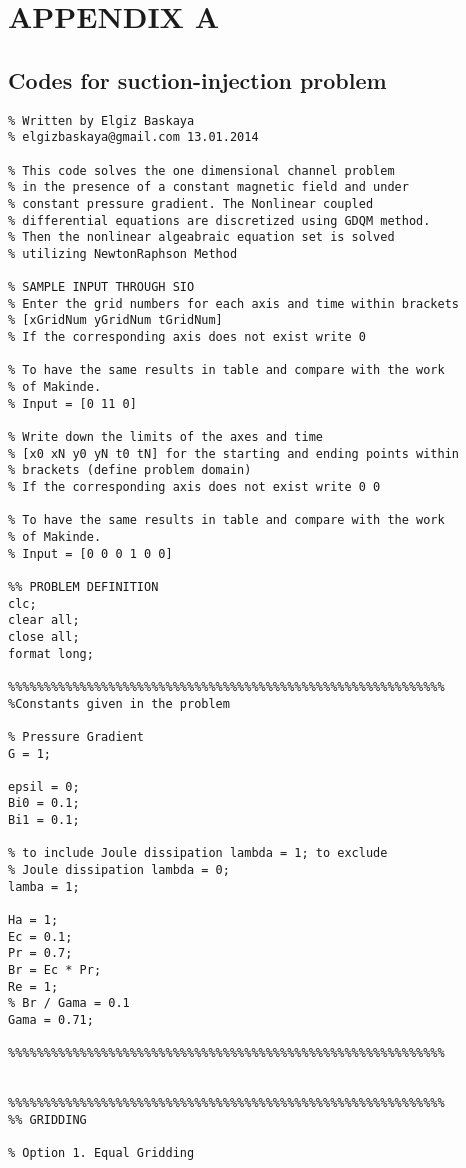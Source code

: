 \chapter{APPENDIX A}

\section{Codes for suction-injection problem}

\begin{lstlisting}
% Written by Elgiz Baskaya
% elgizbaskaya@gmail.com 13.01.2014

% This code solves the one dimensional channel problem
% in the presence of a constant magnetic field and under 
% constant pressure gradient. The Nonlinear coupled 
% differential equations are discretized using GDQM method.
% Then the nonlinear algeabraic equation set is solved 
% utilizing NewtonRaphson Method

% SAMPLE INPUT THROUGH SIO 
% Enter the grid numbers for each axis and time within brackets
% [xGridNum yGridNum tGridNum]
% If the corresponding axis does not exist write 0 

% To have the same results in table and compare with the work 
% of Makinde.
% Input = [0 11 0]

% Write down the limits of the axes and time 
% [x0 xN y0 yN t0 tN] for the starting and ending points within 
% brackets (define problem domain)
% If the corresponding axis does not exist write 0 0  

% To have the same results in table and compare with the work 
% of Makinde.
% Input = [0 0 0 1 0 0]

%% PROBLEM DEFINITION
clc;
clear all;
close all;
format long;

%%%%%%%%%%%%%%%%%%%%%%%%%%%%%%%%%%%%%%%%%%%%%%%%%%%%%%%%%%%%%
%Constants given in the problem

% Pressure Gradient
G = 1;

epsil = 0;
Bi0 = 0.1;
Bi1 = 0.1;

% to include Joule dissipation lambda = 1; to exclude 
% Joule dissipation lambda = 0; 
lamba = 1;

Ha = 1;
Ec = 0.1;
Pr = 0.7;
Br = Ec * Pr;
Re = 1;
% Br / Gama = 0.1
Gama = 0.71;

%%%%%%%%%%%%%%%%%%%%%%%%%%%%%%%%%%%%%%%%%%%%%%%%%%%%%%%%%%%%%


%%%%%%%%%%%%%%%%%%%%%%%%%%%%%%%%%%%%%%%%%%%%%%%%%%%%%%%%%%%%%
%% GRIDDING

% Option 1. Equal Gridding


\end{lstlisting}
